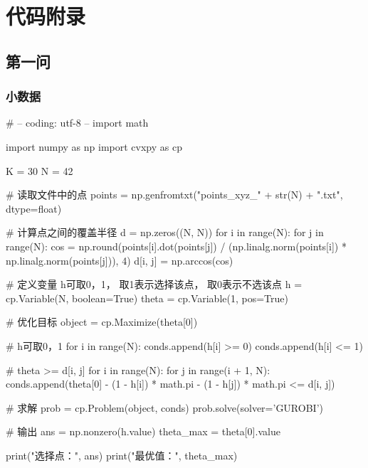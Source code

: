 \chapter{代码附录}
\section{第一问}
\subsection{小数据}
\begin{python}
# -- coding: utf-8 --
import math

import numpy as np
import cvxpy as cp

K = 30
N = 42

# 读取文件中的点
points = np.genfromtxt("points_xyz_" + str(N) + ".txt", dtype=float)

# 计算点之间的覆盖半径
d = np.zeros((N, N))
for i in range(N):
    for j in range(N):
        cos = np.round(points[i].dot(points[j]) / (np.linalg.norm(points[i]) * np.linalg.norm(points[j])), 4)
        d[i, j] = np.arccos(cos)

# 定义变量 h可取0，1， 取1表示选择该点， 取0表示不选该点
h = cp.Variable(N, boolean=True)
theta = cp.Variable(1, pos=True)

# 优化目标
object = cp.Maximize(theta[0])

# h可取0，1
for i in range(N):
    conds.append(h[i] >= 0)
    conds.append(h[i] <= 1)

# theta >= d[i, j]
for i in range(N):
    for j in range(i + 1, N):
        conds.append(theta[0] - (1 - h[i]) * math.pi - (1 - h[j]) * math.pi <= d[i, j])

# 求解
prob = cp.Problem(object, conds)
prob.solve(solver='GUROBI')

# 输出
ans = np.nonzero(h.value)
theta_max = theta[0].value

print("选择点：", ans)
print("最优值：", theta_max)

\end{python}

